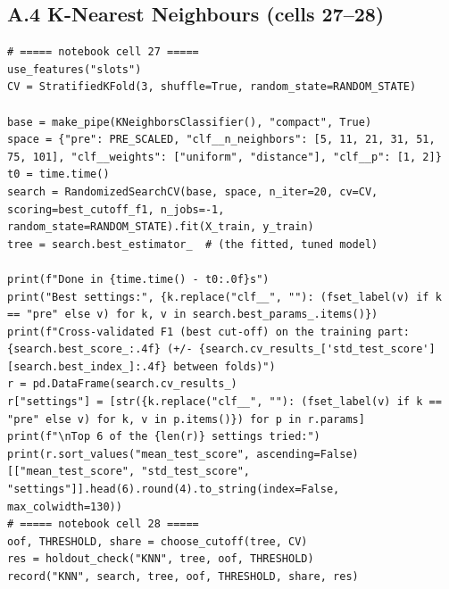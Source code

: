 \documentclass[12pt,a4paper]{article}
\begin{document}
\subsection*{A.4 K-Nearest Neighbours (cells 27--28)}
\begin{lstlisting}[style=code]
# ===== notebook cell 27 =====
use_features("slots")
CV = StratifiedKFold(3, shuffle=True, random_state=RANDOM_STATE)

base = make_pipe(KNeighborsClassifier(), "compact", True)
space = {"pre": PRE_SCALED, "clf__n_neighbors": [5, 11, 21, 31, 51, 75, 101], "clf__weights": ["uniform", "distance"], "clf__p": [1, 2]}
t0 = time.time()
search = RandomizedSearchCV(base, space, n_iter=20, cv=CV, scoring=best_cutoff_f1, n_jobs=-1, random_state=RANDOM_STATE).fit(X_train, y_train)
tree = search.best_estimator_  # (the fitted, tuned model)

print(f"Done in {time.time() - t0:.0f}s")
print("Best settings:", {k.replace("clf__", ""): (fset_label(v) if k == "pre" else v) for k, v in search.best_params_.items()})
print(f"Cross-validated F1 (best cut-off) on the training part: {search.best_score_:.4f} (+/- {search.cv_results_['std_test_score'][search.best_index_]:.4f} between folds)")
r = pd.DataFrame(search.cv_results_)
r["settings"] = [str({k.replace("clf__", ""): (fset_label(v) if k == "pre" else v) for k, v in p.items()}) for p in r.params]
print(f"\nTop 6 of the {len(r)} settings tried:")
print(r.sort_values("mean_test_score", ascending=False)[["mean_test_score", "std_test_score", "settings"]].head(6).round(4).to_string(index=False, max_colwidth=130))
# ===== notebook cell 28 =====
oof, THRESHOLD, share = choose_cutoff(tree, CV)
res = holdout_check("KNN", tree, oof, THRESHOLD)
record("KNN", search, tree, oof, THRESHOLD, share, res)
\end{lstlisting}
\end{document}
